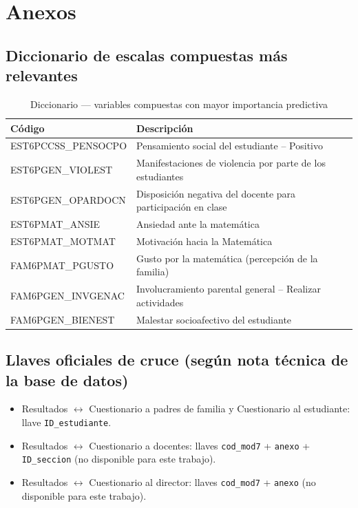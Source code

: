 \documentclass[11pt]{article}
\begin{document}
\appendix
\section{Anexos}

\subsection{Diccionario de escalas compuestas más relevantes}

\begin{table}[h]
\centering
\footnotesize
\begin{tabular}{ll}
\toprule
\textbf{Código} & \textbf{Descripción} \\
\midrule
EST6PCCSS\_PENSOCPO & Pensamiento social del estudiante -- Positivo \\
EST6PGEN\_VIOLEST   & Manifestaciones de violencia por parte de los estudiantes \\
EST6PGEN\_OPARDOCN  & Disposición negativa del docente para participación en clase \\
EST6PMAT\_ANSIE     & Ansiedad ante la matemática \\
EST6PMAT\_MOTMAT    & Motivación hacia la Matemática \\
FAM6PMAT\_PGUSTO    & Gusto por la matemática (percepción de la familia) \\
FAM6PGEN\_INVGENAC  & Involucramiento parental general -- Realizar actividades \\
FAM6PGEN\_BIENEST   & Malestar socioafectivo del estudiante \\
\bottomrule
\end{tabular}
\caption{Diccionario --- variables compuestas con mayor importancia predictiva}
\end{table}

\subsection{Llaves oficiales de cruce (según nota técnica de la base de datos)}

\begin{itemize}
    \item Resultados $\leftrightarrow$ Cuestionario a padres de familia
    y Cuestionario al estudiante: llave \texttt{ID\_estudiante}.
    \item Resultados $\leftrightarrow$ Cuestionario a docentes: llaves
    \texttt{cod\_mod7} + \texttt{anexo} + \texttt{ID\_seccion} (no
    disponible para este trabajo).
    \item Resultados $\leftrightarrow$ Cuestionario al director: llaves
    \texttt{cod\_mod7} + \texttt{anexo} (no disponible para este
    trabajo).
\end{itemize}
\end{document}
